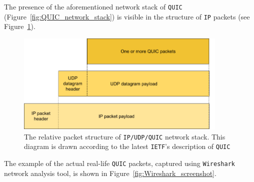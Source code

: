 \documentclass[12pt,a4paper,twoside,openright]{report}
\begin{document}
The presence of the aforementioned network stack of \texttt{QUIC} (Figure~\ref{fig:QUIC_network_stack}) is visible in the structure of \texttt{IP} packets (see Figure~\ref{fig:IP_UDP_QUIC_packets}).
    \begin{figure}[H]
    \centering
    \includegraphics[width=0.9\textwidth]{figs/IP_UDP_QUIC packets.png}
    \caption{The relative packet structure of \texttt{IP/UDP/QUIC} network stack. This diagram is drawn according to the latest \texttt{IETF}'s description of \texttt{QUIC} \cite{ietf-quic-transport-34}}
    \label{fig:IP_UDP_QUIC_packets}
    \end{figure}




The example of the actual real-life \texttt{QUIC} packets, captured using \texttt{Wireshark} network analysis tool, is shown in Figure~\ref{fig:Wireshark_screenshot}.
\end{document}
